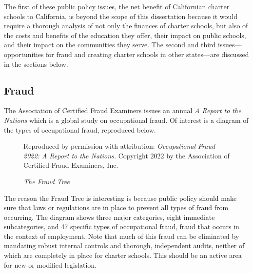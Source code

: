 The first of these public policy issues, the net benefit of Californian charter schools to California, is beyond the scope of this dissertation because it would require a thorough analysis of not only the finances of charter schools, but also of the costs and benefits of the education they offer, their impact on public schools, and their impact on the communities they serve. The second and third issues—opportunities for fraud and creating charter schools in other states—are discussed in the sections below.

\subsection{Fraud}%
\label{sec:fraud}\indent%

The Association of Certified Fraud Examiners issues an annual \textit{A Report to the Nations} which is a global study on occupational fraud. Of interest is a diagram of the types of occupational fraud, reproduced below.
\begin{figure}[htp]
  \caption{\textit{The Fraud Tree}}%
  \label{fig:fraud-tree}\centering%
  {Reproduced by permission with attribution: \textit{Occupational Fraud 2022: A Report to the Nations.} Copyright 2022 by the Association of Certified Fraud Examiners, Inc.}
\end{figure}
The reason the Fraud Tree is interesting is because public policy should make sure that laws or regulations are in place to prevent all types of fraud from occurring. The diagram shows three major categories, eight immediate subcategories, and 47 specific types of occupational fraud, fraud that occurs in the context of employment. Note that much of this fraud can be eliminated by mandating robust internal controls and thorough, independent audits, neither of which are completely in place for charter schools. This should be an active area for new or modified legislation.

